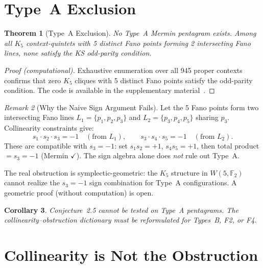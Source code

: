 \documentclass[11pt,a4paper]{article}
\newtheorem{theorem}{Theorem}[section]
\newtheorem{corollary}[theorem]{Corollary}
\theoremstyle{remark}
\newtheorem{remark}[theorem]{Remark}
\newcommand{\F}{\mathbb{F}}
\begin{document}
\section{Type~A Exclusion}
\label{sec:type-a}

\begin{theorem}[Type~A Exclusion]
\label{thm:type-a}
No Type~A Mermin pentagram exists. Among all $K_5$ context-quintets
with 5 distinct Fano points forming 2 intersecting Fano lines, none
satisfy the KS odd-parity condition.
\end{theorem}

\begin{proof}[Proof (computational)]
Exhaustive enumeration over all 945 proper contexts confirms that
zero $K_5$ cliques with 5 distinct Fano points satisfy the odd-parity
condition. The code is available in the supplementary
material~\cite{PaperXsuppl}.
\end{proof}

\begin{remark}[Why the Naive Sign Argument Fails]
Let the 5 Fano points form two intersecting Fano lines
$L_1 = \{p_1, p_2, p_3\}$ and $L_2 = \{p_3, p_4, p_5\}$ sharing $p_3$.
Collinearity constraints give:
\[
s_1 \cdot s_2 \cdot s_3 = -1 \quad (\text{from } L_1), \qquad
s_3 \cdot s_4 \cdot s_5 = -1 \quad (\text{from } L_2).
\]
These are compatible with $s_3 = -1$: set $s_1 s_2 = +1$,
$s_4 s_5 = +1$, then total product $= s_3 = -1$ (Mermin $\checkmark$).
The sign algebra alone does \emph{not} rule out Type~A.

The real obstruction is symplectic-geometric: the $K_5$ structure in
$W(5, \F_2)$ cannot realize the $s_3 = -1$ sign combination for Type~A
configurations. A geometric proof (without computation) is open.
\end{remark}

\begin{corollary}
\label{cor:type-a}
Conjecture~2.5 cannot be tested on Type~A pentagrams. The
collinearity--obstruction dictionary must be reformulated for Types~B,
F2, or F4.
\end{corollary}

\section{Collinearity is Not the Obstruction}
\label{sec:collinearity-failure}
\end{document}

